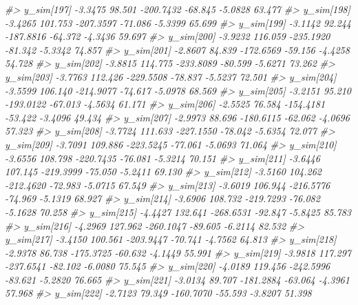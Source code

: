 \documentclass[
  10pt,
  italian,
  a4paper,
  extrafontsizes,onecolumn,openright
  ]{memoir}
\newenvironment{Shaded}{\begin{snugshade}}{\end{snugshade}}
\newcommand{\CommentTok}[1]{\textcolor[rgb]{0.56,0.35,0.01}{\textit{#1}}}
\begin{document}
\begin{Shaded}
\begin{Highlighting}[]
\CommentTok{\#\textgreater{}   y\_sim[197] {-}3.3475  98.501 {-}200.7432 {-}68.845 {-}5.0828 63.477}
\CommentTok{\#\textgreater{}   y\_sim[198] {-}3.4265 101.753 {-}207.3597 {-}71.086 {-}5.3399 65.699}
\CommentTok{\#\textgreater{}   y\_sim[199] {-}3.1142  92.244 {-}187.8816 {-}64.372 {-}4.3436 59.697}
\CommentTok{\#\textgreater{}   y\_sim[200] {-}3.9232 116.059 {-}235.1920 {-}81.342 {-}5.3342 74.857}
\CommentTok{\#\textgreater{}   y\_sim[201] {-}2.8607  84.839 {-}172.6569 {-}59.156 {-}4.4258 54.728}
\CommentTok{\#\textgreater{}   y\_sim[202] {-}3.8815 114.775 {-}233.8089 {-}80.599 {-}5.6271 73.262}
\CommentTok{\#\textgreater{}   y\_sim[203] {-}3.7763 112.426 {-}229.5508 {-}78.837 {-}5.5237 72.501}
\CommentTok{\#\textgreater{}   y\_sim[204] {-}3.5599 106.140 {-}214.9077 {-}74.617 {-}5.0978 68.569}
\CommentTok{\#\textgreater{}   y\_sim[205] {-}3.2151  95.210 {-}193.0122 {-}67.013 {-}4.5634 61.171}
\CommentTok{\#\textgreater{}   y\_sim[206] {-}2.5525  76.584 {-}154.4181 {-}53.422 {-}3.4096 49.434}
\CommentTok{\#\textgreater{}   y\_sim[207] {-}2.9973  88.696 {-}180.6115 {-}62.062 {-}4.0696 57.323}
\CommentTok{\#\textgreater{}   y\_sim[208] {-}3.7724 111.633 {-}227.1550 {-}78.042 {-}5.6354 72.077}
\CommentTok{\#\textgreater{}   y\_sim[209] {-}3.7091 109.886 {-}223.5245 {-}77.061 {-}5.0693 71.064}
\CommentTok{\#\textgreater{}   y\_sim[210] {-}3.6556 108.798 {-}220.7435 {-}76.081 {-}5.3214 70.151}
\CommentTok{\#\textgreater{}   y\_sim[211] {-}3.6446 107.145 {-}219.3999 {-}75.050 {-}5.2411 69.130}
\CommentTok{\#\textgreater{}   y\_sim[212] {-}3.5160 104.262 {-}212.4620 {-}72.983 {-}5.0715 67.549}
\CommentTok{\#\textgreater{}   y\_sim[213] {-}3.6019 106.944 {-}216.5776 {-}74.969 {-}5.1319 68.927}
\CommentTok{\#\textgreater{}   y\_sim[214] {-}3.6906 108.732 {-}219.7293 {-}76.082 {-}5.1628 70.258}
\CommentTok{\#\textgreater{}   y\_sim[215] {-}4.4427 132.641 {-}268.6531 {-}92.847 {-}5.8425 85.783}
\CommentTok{\#\textgreater{}   y\_sim[216] {-}4.2969 127.962 {-}260.1047 {-}89.605 {-}6.2114 82.532}
\CommentTok{\#\textgreater{}   y\_sim[217] {-}3.4150 100.561 {-}203.9447 {-}70.741 {-}4.7562 64.813}
\CommentTok{\#\textgreater{}   y\_sim[218] {-}2.9378  86.738 {-}175.3725 {-}60.632 {-}4.1449 55.991}
\CommentTok{\#\textgreater{}   y\_sim[219] {-}3.9818 117.297 {-}237.6541 {-}82.102 {-}6.0080 75.545}
\CommentTok{\#\textgreater{}   y\_sim[220] {-}4.0189 119.456 {-}242.5996 {-}83.621 {-}5.2820 76.665}
\CommentTok{\#\textgreater{}   y\_sim[221] {-}3.0134  89.707 {-}181.2884 {-}63.064 {-}4.3961 57.968}
\CommentTok{\#\textgreater{}   y\_sim[222] {-}2.7123  79.349 {-}160.7070 {-}55.593 {-}3.8207 51.398}

\end{Highlighting}
\end{Shaded}
\end{document}
